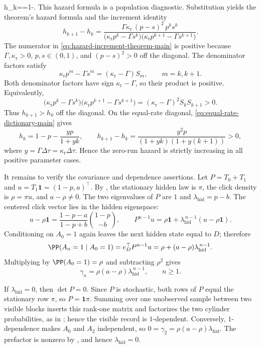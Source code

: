 h_k==1-.
\]
This hazard formula is a population diagnostic.  Substitution yields the
theorem's hazard formula and the increment identity
\begin{equation}\label{eq:hazard-increment-theorem-main}
h_{k+1}-h_k
=
\frac{
  \Gamma\kappa_{\mathrm r}\,
  (p-s)^2\,p^k s^k
}{
  \bigl(\kappa_{\mathrm r}p^k-\Gamma s^k\bigr)
  \bigl(\kappa_{\mathrm r}p^{k+1}-\Gamma s^{k+1}\bigr)
}.
\end{equation}
The numerator in \eqref{eq:hazard-increment-theorem-main} is positive because
\(\Gamma,\kappa_{\mathrm r}>0\), \(p,s\in(0,1)\), and \((p-s)^2>0\) off the
diagonal.  The denominator factors satisfy
\[
\kappa_{\mathrm r}p^m-\Gamma s^m
=(\kappa_{\mathrm r}-\Gamma)S_m,\qquad m=k,k+1.
\]
Both denominator factors have sign \(\kappa_{\mathrm r}-\Gamma\), so their
product is positive.  Equivalently,
\[
\bigl(\kappa_{\mathrm r}p^k-\Gamma s^k\bigr)
\bigl(\kappa_{\mathrm r}p^{k+1}-\Gamma s^{k+1}\bigr)
=(\kappa_{\mathrm r}-\Gamma)^2S_kS_{k+1}>0.
\]
Thus \(h_{k+1}>h_k\) off the diagonal.  On the equal-rate diagonal,
\eqref{eq:equal-rate-dictionary-main} gives
\[
h_k=1-p-\frac{yp}{1+yk},\qquad
h_{k+1}-h_k=
\frac{y^2p}{(1+yk)(1+y(k+1))}>0,
\]
where \(y=\Gamma\Delta\tau=\kappa_{\mathrm r}\Delta\tau\).  Hence the
zero-run hazard is strictly increasing in all positive parameter cases.

It remains to verify the covariance and dependence assertions.  Let
\(P=T_0+T_1\) and \(u=T_1\mathbf1=(1-p,a)^\top\).  By
, the stationary hidden law is \(\pi\), the click
density is \(\rho=\pi u\), and \(a-\rho\ne0\).  The two eigenvalues of \(P\)
are \(1\) and \(\lambda_{\mathrm{hid}}=p-b\).  The centered click vector lies
in the hidden eigenspace:
\[
u-\rho\mathbf1=\frac{1-p-a}{1-p+b}\binom{1-p}{-b},
\qquad
P^{n-1}u=\rho\mathbf1+
\lambda_{\mathrm{hid}}^{\,n-1}(u-\rho\mathbf1).
\]
Conditioning on \(A_0=1\) again leaves the next hidden state equal to \(D\);
therefore
\[
\PP(A_n=1\mid A_0=1)
=e_D^\top P^{n-1}u
=\rho+(a-\rho)\lambda_{\mathrm{hid}}^{\,n-1}.
\]
Multiplying by \(\PP(A_0=1)=\rho\) and subtracting \(\rho^2\) gives
\[
\gamma_n=\rho(a-\rho)\lambda_{\mathrm{hid}}^{\,n-1},\qquad n\ge1 .
\]

If \(\lambda_{\mathrm{hid}}=0\), then \(\det P=0\).  Since \(P\) is stochastic,
both rows of \(P\) equal the stationary row \(\pi\), so \(P=\mathbf1\pi\).
Summing over one unobserved sample between two visible blocks inserts this
rank-one matrix and factorizes the two cylinder probabilities, as in
; hence the visible record is
\(1\)-dependent.  Conversely, \(1\)-dependence makes \(A_0\) and \(A_2\)
independent, so \(0=\gamma_2=\rho(a-\rho)\lambda_{\mathrm{hid}}\).  The
prefactor is nonzero by , and hence
\(\lambda_{\mathrm{hid}}=0\).

